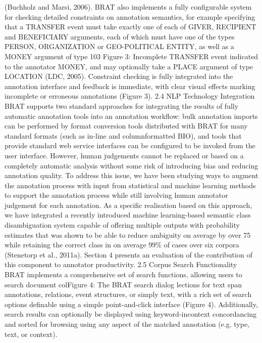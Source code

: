 \begin{description}
    (Buchholz and Marsi, 2006).
    BRAT also implements a fully configurable system for checking detailed constraints on annotation semantics, for example specifying that a
    TRANSFER event must take exactly one of each
    of GIVER, RECIPIENT and BENEFICIARY arguments, each of which must have one of the types
    PERSON, ORGANIZATION or GEO-POLITICAL
    ENTITY, as well as a MONEY argument of type
    103
    Figure 3: Incomplete TRANSFER event indicated
    to the annotator
    MONEY, and may optionally take a PLACE argument of type LOCATION (LDC, 2005). Constraint
    checking is fully integrated into the annotation interface and feedback is immediate, with clear visual effects marking incomplete or erroneous annotations (Figure 3).
    2.4 NLP Technology Integration
    BRAT supports two standard approaches for integrating the results of fully automatic annotation
    tools into an annotation workflow: bulk annotation imports can be performed by format conversion tools distributed with BRAT for many
    standard formats (such as in-line and columnformatted BIO), and tools that provide standard
    web service interfaces can be configured to be invoked from the user interface.
    However, human judgements cannot be replaced or based on a completely automatic analysis without some risk of introducing bias and reducing annotation quality. To address this issue,
    we have been studying ways to augment the annotation process with input from statistical and
    machine learning methods to support the annotation process while still involving human annotator
    judgement for each annotation.
    As a specific realisation based on this approach,
    we have integrated a recently introduced machine learning-based semantic class disambiguation system capable of offering multiple outputs
    with probability estimates that was shown to be
    able to reduce ambiguity on average by over 75%
    while retaining the correct class in on average
    99\% of cases over six corpora (Stenetorp et al.,
    2011a). Section 4 presents an evaluation of the
    contribution of this component to annotator productivity.
    2.5 Corpus Search Functionality
    BRAT implements a comprehensive set of search
    functions, allowing users to search document colFigure 4: The BRAT search dialog
    lections for text span annotations, relations, event
    structures, or simply text, with a rich set of search
    options definable using a simple point-and-click
    interface (Figure 4). Additionally, search results
    can optionally be displayed using keyword-incontext concordancing and sorted for browsing
    using any aspect of the matched annotation (e.g.
    type, text, or context).


\end{description}
